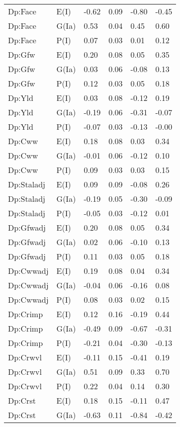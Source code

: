 \begin{center}
\begin{longtable}{|p{1.1in}|p{0.7in}|p{0.7in}|p{0.6in}|p{0.6in}|p{0.6in}|}
  Dp:Face & E(I) & -0.62 & 0.09 & -0.80 & -0.45 \\ 
  Dp:Face & G(Ia) & 0.53 & 0.04 & 0.45 & 0.60 \\ 
  Dp:Face & P(I) & 0.07 & 0.03 & 0.01 & 0.12 \\ 
  Dp:Gfw & E(I) & 0.20 & 0.08 & 0.05 & 0.35 \\ 
  Dp:Gfw & G(Ia) & 0.03 & 0.06 & -0.08 & 0.13 \\ 
  Dp:Gfw & P(I) & 0.12 & 0.03 & 0.05 & 0.18 \\ 
  Dp:Yld & E(I) & 0.03 & 0.08 & -0.12 & 0.19 \\ 
  Dp:Yld & G(Ia) & -0.19 & 0.06 & -0.31 & -0.07 \\ 
  Dp:Yld & P(I) & -0.07 & 0.03 & -0.13 & -0.00 \\ 
  Dp:Cww & E(I) & 0.18 & 0.08 & 0.03 & 0.34 \\ 
  Dp:Cww & G(Ia) & -0.01 & 0.06 & -0.12 & 0.10 \\ 
  Dp:Cww & P(I) & 0.09 & 0.03 & 0.03 & 0.15 \\ 
  Dp:Staladj & E(I) & 0.09 & 0.09 & -0.08 & 0.26 \\ 
  Dp:Staladj & G(Ia) & -0.19 & 0.05 & -0.30 & -0.09 \\ 
  Dp:Staladj & P(I) & -0.05 & 0.03 & -0.12 & 0.01 \\ 
  Dp:Gfwadj & E(I) & 0.20 & 0.08 & 0.05 & 0.34 \\ 
  Dp:Gfwadj & G(Ia) & 0.02 & 0.06 & -0.10 & 0.13 \\ 
  Dp:Gfwadj & P(I) & 0.11 & 0.03 & 0.05 & 0.18 \\ 
  Dp:Cwwadj & E(I) & 0.19 & 0.08 & 0.04 & 0.34 \\ 
  Dp:Cwwadj & G(Ia) & -0.04 & 0.06 & -0.16 & 0.08 \\ 
  Dp:Cwwadj & P(I) & 0.08 & 0.03 & 0.02 & 0.15 \\ 
  Dp:Crimp & E(I) & 0.12 & 0.16 & -0.19 & 0.44 \\ 
  Dp:Crimp & G(Ia) & -0.49 & 0.09 & -0.67 & -0.31 \\ 
  Dp:Crimp & P(I) & -0.21 & 0.04 & -0.30 & -0.13 \\ 
  Dp:Crwvl & E(I) & -0.11 & 0.15 & -0.41 & 0.19 \\ 
  Dp:Crwvl & G(Ia) & 0.51 & 0.09 & 0.33 & 0.70 \\ 
  Dp:Crwvl & P(I) & 0.22 & 0.04 & 0.14 & 0.30 \\ 
  Dp:Crst & E(I) & 0.18 & 0.15 & -0.11 & 0.47 \\ 
  Dp:Crst & G(Ia) & -0.63 & 0.11 & -0.84 & -0.42 \\ 

\end{longtable}
\end{center}
